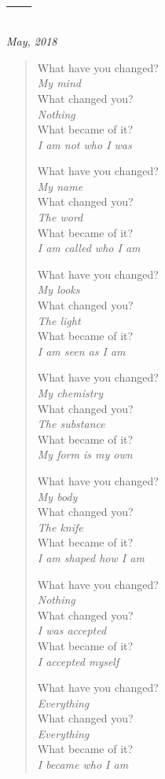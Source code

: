 \newpage
\section{---}

\hfill\textit{May, 2018}

\begin{verse}
What have you changed?\\
\vin \emph{My mind}\\
What changed you?\\
\vin \emph{Nothing}\\
What became of it?\\
\vin \emph{I am not who I was}

What have you changed?\\
\vin \emph{My name}\\
What changed you?\\
\vin \emph{The word}\\
What became of it?\\
\vin \emph{I am called who I am}

What have you changed?\\
\vin \emph{My looks}\\
What changed you?\\
\vin \emph{The light}\\
What became of it?\\
\vin \emph{I am seen as I am}

What have you changed?\\
\vin \emph{My chemistry}\\
What changed you?\\
\vin \emph{The substance}\\
What became of it?\\
\vin \emph{My form is my own}
\newpage

What have you changed?\\
\vin \emph{My body}\\
What changed you?\\
\vin \emph{The knife}\\
What became of it?\\
\vin \emph{I am shaped how I am}

What have you changed?\\
\vin \emph{Nothing}\\
What changed you?\\
\vin \emph{I was accepted}\\
What became of it?\\
\vin \emph{I accepted myself}

What have you changed?\\
\vin \emph{Everything}\\
What changed you?\\
\vin \emph{Everything}\\
What became of it?\\
\vin \emph{I became who I am}
\end{verse}
